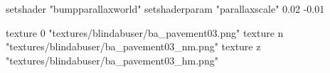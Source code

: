 	setshader "bumpparallaxworld"
	setshaderparam "parallaxscale" 0.02 -0.01

		texture 0 "textures/blindabuser/ba_pavement03.png"
		texture n "textures/blindabuser/ba_pavement03_nm.png"
		texture z "textures/blindabuser/ba_pavement03_hm.png"
